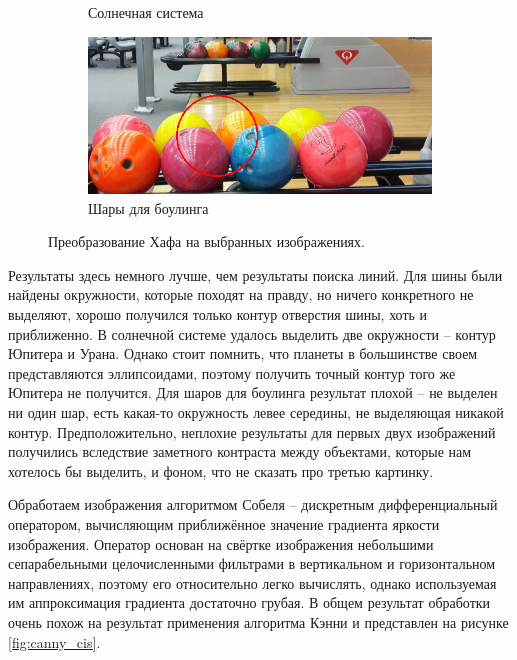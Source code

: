 \documentclass[a4paper, 16pt]{article}
\begin{document}
\begin{figure}[htbp]
\begin{subfigure}{0.3\textwidth}
            \caption{Солнечная система}
            \label{fig:hc_ci2}
        \end{subfigure}
        \hfill
        \begin{subfigure}{0.3\textwidth}
            \centering
            \includegraphics[width=\linewidth]{hc_ci3.png}
            \caption{Шары для боулинга}
            \label{fig:hc_ci3}
        \end{subfigure}
        \caption{Преобразование Хафа на выбранных изображениях.}
        \label{fig:hc_cis}
    \end{figure}


    \noindent Результаты здесь немного лучше, чем результаты поиска линий. Для шины были найдены окружности, которые
    походят на правду, но ничего конкретного не выделяют, хорошо получился только контур отверстия шины, хоть и приближенно.
    В солнечной системе удалось выделить две окружности -- контур Юпитера и Урана. Однако стоит помнить, что планеты в большинстве
    своем представляются эллипсоидами, поэтому получить точный контур того же Юпитера не получится. Для шаров для боулинга результат
    плохой -- не выделен ни один шар, есть какая-то окружность левее середины, не выделяющая никакой контур. Предположительно, неплохие
    результаты для первых двух изображений получились вследствие заметного контраста между объектами, которые нам хотелось бы выделить, и
    фоном, что не сказать про третью картинку.


    \noindent Обработаем изображения алгоритмом Собеля -- дискретным дифференциальный оператором, вычисляющим приближённое значение градиента яркости изображения.
    Оператор основан на свёртке изображения небольшими сепарабельными целочисленными фильтрами в вертикальном и горизонтальном направлениях, поэтому его относительно легко вычислять,
    однако используемая им аппроксимация градиента достаточно грубая. В общем результат обработки очень похож на результат применения алгоритма Кэнни и представлен на рисунке \ref{fig:canny_cis}.
\end{document}
